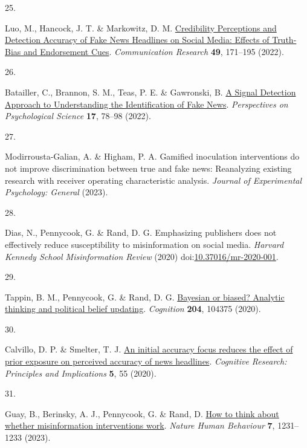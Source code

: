 \documentclass[
  doc,floatsintext]{apa6}
\newlength{\cslhangindent}
\newlength{\csllabelwidth}
\newenvironment{CSLReferences}[2] %
 {\begin{list}{}{%
  \setlength{\itemindent}{0pt}
  \setlength{\leftmargin}{0pt}
  \setlength{\parsep}{0pt}
  \ifodd #1
   \setlength{\leftmargin}{\cslhangindent}
   \setlength{\itemindent}{-1\cslhangindent}
  \fi
  \setlength{\itemsep}{#2\baselineskip}}}
 {\end{list}}
\newcommand{\CSLLeftMargin}[1]{\parbox[t]{\csllabelwidth}{\strut#1\strut}}
\newcommand{\CSLRightInline}[1]{\parbox[t]{\linewidth - \csllabelwidth}{\strut#1\strut}}
\begin{document}
\begin{CSLReferences}{0}{0}
\CSLLeftMargin{25. }%
\CSLRightInline{Luo, M., Hancock, J. T. \& Markowitz, D. M. \href{https://doi.org/10.1177/0093650220921321}{Credibility Perceptions and Detection Accuracy of Fake News Headlines on Social Media: Effects of Truth-Bias and Endorsement Cues}. \emph{Communication Research} \textbf{49}, 171--195 (2022).}

\CSLLeftMargin{26. }%
\CSLRightInline{Batailler, C., Brannon, S. M., Teas, P. E. \& Gawronski, B. \href{https://doi.org/10.1177/1745691620986135}{A Signal Detection Approach to Understanding the Identification of Fake News}. \emph{Perspectives on Psychological Science} \textbf{17}, 78--98 (2022).}

\CSLLeftMargin{27. }%
\CSLRightInline{Modirrousta-Galian, A. \& Higham, P. A. Gamified inoculation interventions do not improve discrimination between true and fake news: Reanalyzing existing research with receiver operating characteristic analysis. \emph{Journal of Experimental Psychology: General} (2023).}

\CSLLeftMargin{28. }%
\CSLRightInline{Dias, N., Pennycook, G. \& Rand, D. G. Emphasizing publishers does not effectively reduce susceptibility to misinformation on social media. \emph{Harvard Kennedy School Misinformation Review} (2020) doi:\href{https://doi.org/10.37016/mr-2020-001}{10.37016/mr-2020-001}.}

\CSLLeftMargin{29. }%
\CSLRightInline{Tappin, B. M., Pennycook, G. \& Rand, D. G. \href{https://doi.org/10.1016/j.cognition.2020.104375}{Bayesian or biased? Analytic thinking and political belief updating}. \emph{Cognition} \textbf{204}, 104375 (2020).}

\CSLLeftMargin{30. }%
\CSLRightInline{Calvillo, D. P. \& Smelter, T. J. \href{https://doi.org/10.1186/s41235-020-00257-y}{An initial accuracy focus reduces the effect of prior exposure on perceived accuracy of news headlines}. \emph{Cognitive Research: Principles and Implications} \textbf{5}, 55 (2020).}

\CSLLeftMargin{31. }%
\CSLRightInline{Guay, B., Berinsky, A. J., Pennycook, G. \& Rand, D. \href{https://doi.org/10.1038/s41562-023-01667-w}{How to think about whether misinformation interventions work}. \emph{Nature Human Behaviour} \textbf{7}, 1231--1233 (2023).}


\end{CSLReferences}
\end{document}
